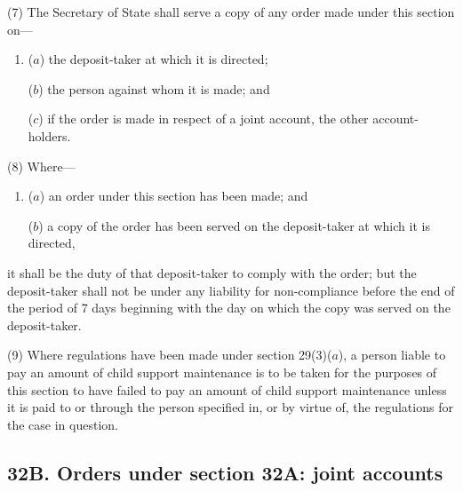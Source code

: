 \documentclass[12pt,a4paper]{article}
\begin{document}
(7) The Secretary of State shall serve a copy of any order made under this section on---
\begin{enumerate}\item[]
($a$) the deposit-taker at which it is directed;

($b$) the person against whom it is made; and

($c$) if the order is made in respect of a joint account, the other account-holders.
\end{enumerate}

(8)
Where---
\begin{enumerate}\item[]
($a$)
an order under this section has been made; and

($b$)
a copy of the order has been served on the deposit-taker at which it is directed, 
\end{enumerate}
it shall be the duty of that deposit-taker to comply with the order; but the deposit-taker shall not be under any liability for non-compliance before the end of the period of 7 days beginning with the day on which the copy was served on the deposit-taker.

(9)
Where regulations have been made under section 29(3)($a$), a person liable to pay an amount of child support maintenance is to be taken for the purposes of this section to have failed to pay an amount of child support maintenance unless it is paid to or through the person specified in, or by virtue of, the regulations for the case in question.


\subsection{32B. Orders under section 32A: joint accounts}
\end{document}
